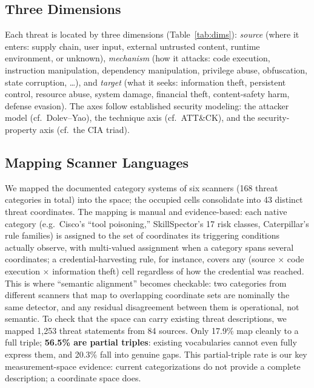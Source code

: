 \documentclass[sigconf,nonacm]{acmart}
\begin{document}
\subsection{Three Dimensions}
Each threat is located by three dimensions (Table~\ref{tab:dims}): \emph{source} (where it enters: supply chain, user input, external untrusted content, runtime environment, or unknown), \emph{mechanism} (how it attacks: code execution, instruction manipulation, dependency manipulation, privilege abuse, obfuscation, state corruption, \ldots), and \emph{target} (what it seeks: information theft, persistent control, resource abuse, system damage, financial theft, content-safety harm, defense evasion). The axes follow established security modeling: the attacker model (cf.\ Dolev--Yao), the technique axis (cf.\ ATT\&CK), and the security-property axis (cf.\ the CIA triad).

\subsection{Mapping Scanner Languages}
We mapped the documented category systems of six scanners (168 threat categories in total) into the space; the occupied cells consolidate into 43 distinct threat coordinates. The mapping is manual and evidence-based: each native category (e.g.\ Cisco's ``tool poisoning,'' SkillSpector's 17 risk classes, Caterpillar's rule families) is assigned to the set of coordinates its triggering conditions actually observe, with multi-valued assignment when a category spans several coordinates; a credential-harvesting rule, for instance, covers any (source $\times$ code execution $\times$ information theft) cell regardless of how the credential was reached. This is where ``semantic alignment'' becomes checkable: two categories from different scanners that map to overlapping coordinate sets are nominally the same detector, and any residual disagreement between them is operational, not semantic. To check that the space can carry existing threat descriptions, we mapped 1{,}253 threat statements from 84 sources. Only 17.9\% map cleanly to a full triple; \textbf{56.5\% are partial triples}: existing vocabularies cannot even fully express them, and 20.3\% fall into genuine gaps. This partial-triple rate is our key measurement-space evidence: current categorizations do not provide a complete description; a coordinate space does.
\end{document}
